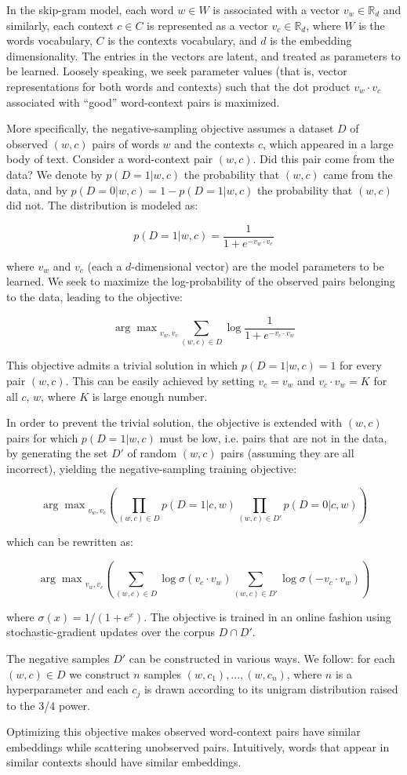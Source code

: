 In the skip-gram model, each word $w \in W$ is associated with a vector $v_w \in \mathbb{R}_d$ and similarly, each context $c \in C$ is represented as a vector $v_c \in \mathbb{R}_d$, where $W$ is the words vocabulary, $C$ is the contexts vocabulary, and $d$ is the embedding dimensionality. The entries in the vectors are latent, and treated as parameters to be learned. Loosely speaking, we seek parameter values (that is, vector representations for both words and contexts) such that the dot product $v_w \cdot v_c$ associated with “good” word-context pairs is maximized.

More specifically, the negative-sampling objective assumes a dataset $D$ of observed $(w, c)$ pairs of words $w$ and the contexts $c$, which appeared in a large body of text. Consider a word-context pair $(w, c)$. Did this pair come from the data? We denote by $p(D = 1|w, c)$ the probability that $(w, c)$ came from the data, and by $p(D = 0|w, c) = 1 - p(D = 1|w, c)$ the probability that $(w, c)$ did not. The distribution is modeled as:


\[
p(D = 1|w, c) = \frac{1}{1+e^{-v_w \cdot v_c}}
\]

where $v_w$ and $v_c$ (each a $d$-dimensional vector) are
the model parameters to be learned. We seek to
maximize the log-probability of the observed pairs
belonging to the data, leading to the objective:

\[
{\arg\max}_{v_w,v_c} \sum_{(w,c) \in D}\log\frac{1}{1+e^{-v_c \cdot v_w}}
\]

This objective admits a trivial solution in which $p(D = 1|w, c)=1$ for every pair $(w, c)$. This can be easily achieved by setting $v_c = v_w$ and $v_c \cdot v_w = K$ for all $c$, $w$, where $K$ is large enough number.

In order to prevent the trivial solution, the objective is extended with $(w, c)$ pairs for which $p(D = 1|w, c)$ must be low, i.e. pairs that are not in the data, by generating the set $D'$ of random $(w, c)$ pairs (assuming they are all incorrect), yielding the negative-sampling training objective:

\[
{\arg\max}_{v_w,v_c} \left ( \prod_{(w,c) \in D}p(D=1|c,w)\prod_{(w,c) \in D'}p(D=0|c,w) \right )
\]

which can be rewritten as:

\[
{\arg\max}_{v_w,v_c} \left ( \sum_{(w,c) \in D} \log{\sigma(v_c \cdot v_w)}  \sum_{(w,c) \in D'} \log{\sigma(-v_c \cdot v_w)}  \right )
\]

where $\sigma(x)=1/(1+e^x)$. The objective is trained
in an online fashion using stochastic-gradient updates over the corpus $D \cap D'$.

The negative samples $D'$ can be constructed in various ways. We follow: for each $(w, c) \in D$ we construct $n$ samples $(w, c_1),...,(w, c_n)$, where $n$ is a hyperparameter and each $c_j$ is drawn according to its unigram distribution raised to the 3/4 power.

Optimizing this objective makes observed word-context pairs have similar embeddings while scattering unobserved pairs. Intuitively, words that appear in similar contexts should have similar embeddings.


